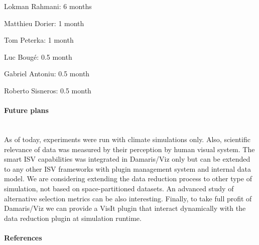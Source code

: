 \begin{refsection}[report2015_tp]
\begin{itemize*}
\item Lokman Rahmani: 6 months
\item Matthieu Dorier: 1 month
\item Tom Peterka: 1 month
\item Luc Bougé: 0.5 month
\item Gabriel Antoniu: 0.5 month
\item Roberto Sisneros: 0.5 month
\end{itemize*}

\paragraph{Future plans}~\\

As of today, experiments were run with climate simulations only. Also, scientific relevance of
data was measured by their perception by human visual system. The smart ISV capabilities was
integrated in Damaris/Viz only but can be extended to any other ISV frameworks with plugin
management system and internal data model. We are considering extending the data
reduction process to other type of simulation, not based on space-partitioned datasets. An
advanced study of alternative selection metrics can be also interesting. Finally, to take full
profit of Damaris/Viz we can provide a VisIt plugin that interact dynamically with the data
reduction plugin at simulation runtime.

\paragraph{References}~\\

\printbibliography[heading=none,notkeyword=own]

\end{refsection}
